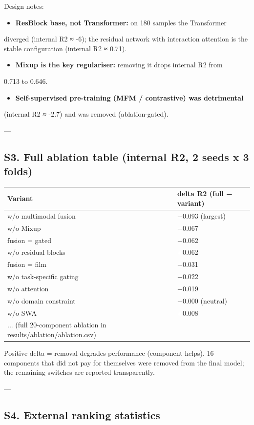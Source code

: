\documentclass[utf8]{frontiers_suppmat}
\begin{document}
Design notes:
\begin{itemize}
\item \textbf{ResBlock base, not Transformer:} on 180 samples the Transformer
\end{itemize}
  diverged (internal R2 ≈ -6); the residual network with interaction
  attention is the stable configuration (internal R2 ≈ 0.71).
\begin{itemize}
\item \textbf{Mixup is the key regulariser:} removing it drops internal R2 from
\end{itemize}
  0.713 to 0.646.
\begin{itemize}
\item \textbf{Self-supervised pre-training (MFM / contrastive) was detrimental}
\end{itemize}
  (internal R2 ≈ -2.7) and was removed (ablation-gated).

---

\subsection{S3. Full ablation table (internal R2, 2 seeds x 3 folds)}

\begin{tabular}{ll}
\toprule
Variant & delta R2 (full − variant) \\
\midrule
w/o multimodal fusion & +0.093 (largest) \\
w/o Mixup & +0.067 \\
fusion = gated & +0.062 \\
w/o residual blocks & +0.062 \\
fusion = film & +0.031 \\
w/o task-specific gating & +0.022 \\
w/o attention & +0.019 \\
w/o domain constraint & +0.000 (neutral) \\
w/o SWA & +0.008 \\
... (full 20-component ablation in results/ablation/ablation.csv) \\
\bottomrule
\end{tabular}


Positive delta = removal degrades performance (component helps). 16
components that did not pay for themselves were removed from the final
model; the remaining switches are reported transparently.

---

\subsection{S4. External ranking statistics}
\end{document}

